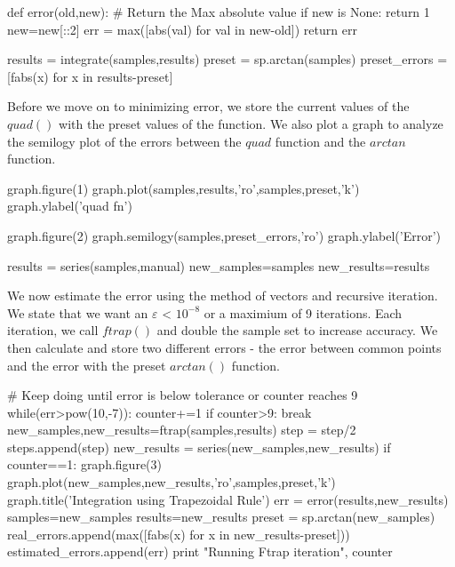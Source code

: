 \documentclass[canadian]{article}
\begin{document}
def error(old,new):
    # Return the Max absolute value
    if new is None:
        return 1
    new=new[::2]
    err = max([abs(val) for val in new-old])
    return err


results = integrate(samples,results)
preset = sp.arctan(samples)
preset_errors = [fabs(x) for x in results-preset]
\nwendcode{}\nwdocspar

%
Before we move on to minimizing error, we store the current values
of the $quad()$ with the preset values of the function. We also plot
a graph to analyze the semilogy plot of the errors between the $quad$
function and the $arctan$ function.

\nwenddocs{}\endmoddef\nwstartdeflinemarkup\nwenddeflinemarkup

graph.figure(1)
graph.plot(samples,results,'ro',samples,preset,'k')
graph.ylabel('quad fn')

graph.figure(2)
graph.semilogy(samples,preset_errors,'ro')
graph.ylabel('Error')

results = series(samples,manual)
new_samples=samples
new_results=results
\nwendcode{}\nwdocspar

%
We now estimate the error using the method of vectors and recursive
iteration. We state that we want an $\varepsilon$ < $10^{-8}$ or
a maximium of 9 iterations. Each iteration, we call $ftrap()$ and
double the sample set to increase accuracy. We then calculate and
store two different errors - the error between common points and the
error with the preset $arctan()$ function\@.

\nwenddocs{}\endmoddef\nwstartdeflinemarkup\nwenddeflinemarkup

# Keep doing until error is below tolerance or counter reaches 9
while(err>pow(10,-7)):
    counter+=1
    if counter>9:
        break
    new_samples,new_results=ftrap(samples,results)
    step = step/2
    steps.append(step)
    new_results = series(new_samples,new_results)
    if counter==1:
        graph.figure(3)
        graph.plot(new_samples,new_results,'ro',samples,preset,'k')
        graph.title('Integration using Trapezoidal Rule') 
    err = error(results,new_results)
    samples=new_samples
    results=new_results
    preset = sp.arctan(new_samples)
    real_errors.append(max([fabs(x) for x in new_results-preset]))
    estimated_errors.append(err)
    print "Running Ftrap iteration", counter 
\nwendcode{}\nwdocspar
\end{document}
